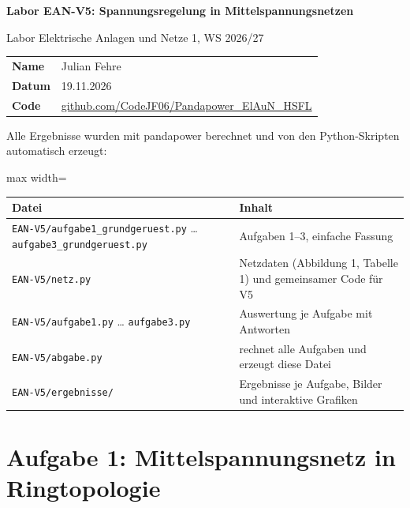 \documentclass[11pt,a4paper]{article}
\begin{document}
\begin{titlepage}
\centering
\vspace*{3cm}
{\LARGE\bfseries Labor EAN-V5: Spannungsregelung in Mittelspannungsnetzen\par}
\vspace{1cm}
{\large Labor Elektrische Anlagen und Netze 1, WS 2026/27\par}
\vspace{2cm}
\begin{tabular}{ll}
\textbf{Name} & Julian Fehre \\
\textbf{Datum} & 19.11.2026 \\
\textbf{Code} & \href{https://github.com/CodeJF06/Pandapower_ElAuN_HSFL/tree/main/EAN-V5}{github.com/CodeJF06/Pandapower\_ElAuN\_HSFL} \\
\end{tabular}
\vfill
\end{titlepage}
\tableofcontents
\clearpage

Alle Ergebnisse wurden mit pandapower berechnet und von den Python-Skripten automatisch erzeugt:

\begin{table}[H]
\centering
\begin{adjustbox}{max width=\linewidth}
\begin{tabular}{>{\raggedright\arraybackslash}p{4.5cm}>{\raggedright\arraybackslash}p{4.5cm}}
\toprule
\textbf{Datei} & \textbf{Inhalt} \\
\midrule
\texttt{EAN-V5/\allowbreak{}aufgabe1\_\allowbreak{}grundgeruest.py} \dots{} \texttt{aufgabe3\_\allowbreak{}grundgeruest.py} & Aufgaben 1–3, einfache Fassung \\
\texttt{EAN-V5/\allowbreak{}netz.py} & Netzdaten (Abbildung 1, Tabelle 1) und gemeinsamer Code für V5 \\
\texttt{EAN-V5/\allowbreak{}aufgabe1.py} \dots{} \texttt{aufgabe3.py} & Auswertung je Aufgabe mit Antworten \\
\texttt{EAN-V5/\allowbreak{}abgabe.py} & rechnet alle Aufgaben und erzeugt diese Datei \\
\texttt{EAN-V5/\allowbreak{}ergebnisse/\allowbreak{}} & Ergebnisse je Aufgabe, Bilder und interaktive Grafiken \\
\bottomrule
\end{tabular}
\end{adjustbox}
\end{table}

\section{Aufgabe 1: Mittelspannungsnetz in Ringtopologie}
\end{document}
